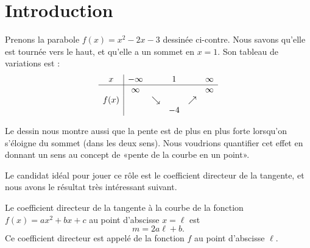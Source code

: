 
\section{Introduction}


\begin{wrapfigure}[14]{r}{7.0cm}
            \vspace{-0.5cm}        %
                \centering
                    
                \end{wrapfigure}
Prenons la parabole \( f(x)=x^2-2x-3\) dessinée ci-contre. Nous savons qu'elle est tournée vers le haut, et qu'elle a un sommet en \( x=1\). Son tableau de variations est :
\begin{equation*}
    \begin{array}[]{c|ccccc}
        x&-\infty&&1&&\infty\\
        \hline
        &\infty&&&&\infty\\
        f(x)&&\searrow&&\nearrow&\\
        &&&-4&&\\
    \end{array}
\end{equation*}

Le dessin nous montre aussi que la pente est de plus en plus forte lorsqu'on s'éloigne du sommet (dans les deux sens). Nous voudrions quantifier cet effet en donnant un sens au concept de «pente de la courbe en un point».

Le candidat idéal pour jouer ce rôle est le coefficient directeur de la tangente, et nous avons le résultat très intéressant suivant.

\begin{Aretenir}
    Le coefficient directeur de la tangente à la courbe de la fonction \( f(x)=ax^2+bx+c\) au point d'abscisse \( x=\ell\) est
    \begin{equation}
        m=2a\ell+b.
    \end{equation}
    Ce coefficient directeur est appelé  de la fonction \( f\) au point d'abscisse \( \ell\).
\end{Aretenir}

